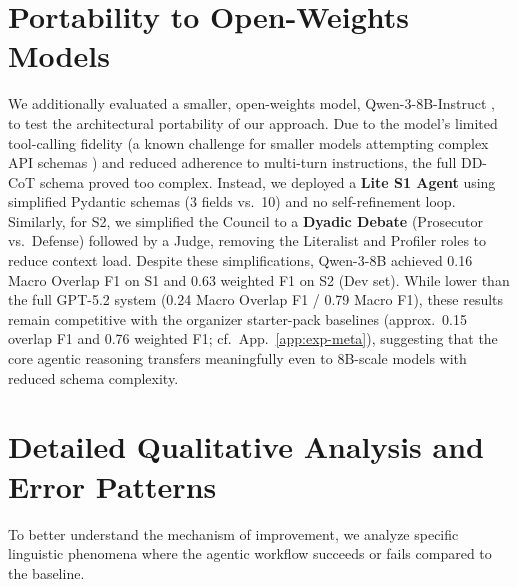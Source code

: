 \documentclass[11pt]{article}
\begin{document}
\section{Portability to Open-Weights Models}
\label{app:open-weights}
We additionally evaluated a smaller, open-weights model, Qwen-3-8B-Instruct \cite{qwen3}, to test the architectural portability of our approach. Due to the model's limited tool-calling fidelity (a known challenge for smaller models attempting complex API schemas \cite{patil2023gorilla}) and reduced adherence to multi-turn instructions, the full DD-CoT schema proved too complex. Instead, we deployed a \textbf{Lite S1 Agent} using simplified Pydantic schemas (3 fields vs.\ 10) and no self-refinement loop. Similarly, for S2, we simplified the Council to a \textbf{Dyadic Debate} (Prosecutor vs.\ Defense) followed by a Judge, removing the Literalist and Profiler roles to reduce context load. Despite these simplifications, Qwen-3-8B achieved 0.16 Macro Overlap F1 on S1 and 0.63 weighted F1 on S2 (Dev set). While lower than the full GPT-5.2 system (0.24 Macro Overlap F1 / 0.79 Macro F1), these results remain competitive with the organizer starter-pack baselines (approx.\ 0.15 overlap F1 and 0.76 weighted F1; cf.\ App.~\ref{app:exp-meta}), suggesting that the core agentic reasoning transfers meaningfully even to 8B-scale models with reduced schema complexity.

\section{Detailed Qualitative Analysis and Error Patterns}
\label{app:qualitative-examples}
To better understand the mechanism of improvement, we analyze specific linguistic phenomena where the agentic workflow succeeds or fails compared to the baseline.

\begin{table}[h]
	\centering
	\scriptsize
	\caption{Qualitative example demonstrating the resolution of agency and mitigation of the Reporter Trap by the agentic pipeline.}
	\label{tab:s5_qualitative}
\end{table}
\end{document}
